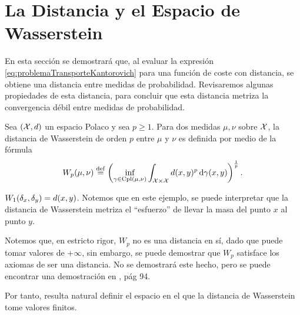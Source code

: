 {{  }

  \section{La Distancia y el Espacio de Wasserstein}\label{sec:la-distancia-y-el-espacio-de-Wasserstein}
  {
	  En esta sección se demostrará que, al evaluar la expresión \eqref{eq:problemaTransporteKantorovich} para una función de coste con distancia, se obtiene una distancia entre medidas de probabilidad. Revisaremos algunas propiedades de esta distancia, para concluir que esta distancia metriza la convergencia débil entre medidas de probabilidad.

	  \begin{definition}\label{def:distanciaWasserstein}
		  Sea $(\cX, d)$ un espacio Polaco y sea $p \geq 1$. Para dos medidas $\mu, \nu$ sobre $\cX$, la distancia de Wasserstein de orden $p$ entre $\mu$ y $\nu$ es definida por medio de la fórmula
		  \begin{equation}
			  \label{eq:distanciaWasserstein}
			  \Wasserstein[p]{\mu}{\nu}  \eqdef \left( \inf_{\gamma \in \Cpl(\mu, \nu)} \int_{\cX \times \cX} d(x, y)^{p} \dgamma[x, y] \right)^{\frac{1}{p}}.
		  \end{equation}

	  \end{definition}

	  \begin{example}
		  $\Wasserstein[1]{\delta_x}{\delta_y} = d(x, y)$. Notemos que en este ejemplo, se puede interpretar que la distancia de Wasserstein metriza el ``esfuerzo'' de llevar la masa del punto $x$ al punto $y$.
	  \end{example}

	  Notemos que, en estricto rigor, $W_p$ no es una distancia en sí, dado que puede tomar valores de $+\infty$, sin embargo, se puede demostrar que $W_p$ satisface los axiomas de ser una distancia. No se demostrará este hecho, pero se puede encontrar una demostración en \cite{villani2009optimal}, pág 94.

	  Por tanto, resulta natural definir el espacio en el que la distancia de Wasserstein tome valores finitos.

}}
